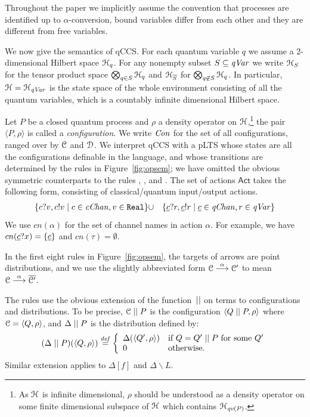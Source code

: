 \documentclass[a4paper,UKenglish,cleveref, autoref]{lipics-v2019}
\def\>{\ensuremath{\rangle}}
\def\<{\ensuremath{\langle}}
\def\h{\ensuremath{\mathcal{H}}}
\newcommand{\define}{\stackrel{\it def}=}
\newcommand{\pdist}[1]{\overline{#1}  } %
\newcommand{\Act}{\ensuremath{\mathsf{Act}}\xspace}
\newcommand{\pair}[1]{\langle{#1}\rangle}
\newcommand{\Con}{{\it Con}}
\newcommand{\qv}{{\it qv}}
\newcommand{\qc}{\underline{c}}
\newcommand{\qVar}{{\it qVar}}
\newcommand{\cChan}{{\it cChan}}
\newcommand{\qChan}{{\it qChan}}
\newcommand{\CH}{{\cal H}}
\newcommand{\CC}{{\cal C}}
\newcommand{\CD}{{\cal D}}
\begin{document}
Throughout the paper we implicitly assume the convention that processes are identified up to $\alpha$-conversion, bound variables differ from each other and they are different from free variables.

We now give the %
semantics of qCCS. For each quantum variable $q$ we assume a 2-dimensional Hilbert space $\CH_q$. For any nonempty subset $S\subseteq \qVar$ we write $\CH_S$ for the tensor product space $\bigotimes_{q\in S}\CH_q$ and $\CH_{\overline{S}}$ for $\bigotimes_{q\not\in S}\CH_q$. In particular, $\CH=\CH_{\qVar}$ is the state space of the whole environment consisting of all the quantum variables, which is a countably infinite dimensional Hilbert space.


Let $P$ be a closed quantum process and $\rho$ a density operator on $\CH$,\footnote{As $\CH$ is infinite dimensional, $\rho$ should be understood as a density operator on some finite dimensional subspace of $\CH$ which contains $\h_{\qv(P)}$.} the pair $\pair{P,\rho}$ is called a \emph{configuration}. We write $\Con$ for the set of all configurations, ranged over by $\CC$ and $\CD$.
We interpret qCCS with a pLTS whose states are all the configurations definable in the language,
and whose transitions are determined by the rules in Figure~\ref{fig:opsem}; we have omitted the obvious
symmetric counterparts to the rules , ,  and
.
The set of actions $\Act$ takes the following form, consisting of classical/quantum input/output actions.
\begin{eqnarray*}
	\sset{c?v, c!v \mid c\in \cChan, v\in\texttt{Real}}&\cup&
	\sset{\qc?r,\qc!r \mid \qc\in \qChan,r\in \qVar}
\end{eqnarray*}
We use $cn(\alpha)$ for the set of channel names in action $\alpha$. For example, we have $cn(\qc?x)=\sset{\qc}$ and $cn(\tau)=\emptyset$.

In the first eight rules in Figure~\ref{fig:opsem}, the targets of arrows are point distributions, and we use the slightly abbreviated form $\CC\ar{\alpha}\CC'$ to mean $\CC\ar{\alpha}\pdist{\CC'}$.

The rules use the obvious extension of the function~$\mathrel{||}$ on terms to configurations and distributions. To be precise,
$\CC\Cpar P$ is the configuration $\<Q\Cpar P,\rho \>$ where $\CC=\<Q,\rho\>$, and
$\Delta\mathrel{||} P$ is the distribution defined by:
\[(\Delta\Cpar P)(\pair{Q,\rho}) \define \left\{\begin{array}{ll}
\Delta(\pair{Q',\rho}) & \mbox{if $Q=Q'\Cpar P$ for some } Q'\\
0 & \mbox{otherwise.}
\end{array}\right.\]
Similar extension applies to $\Delta[f]$ and $\Delta\backslash L$.
\end{document}
